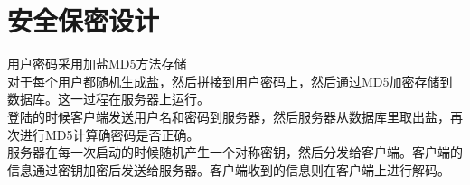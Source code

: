 \chapter{安全保密设计}
用户密码采用加盐MD5方法存储\\
对于每个用户都随机生成盐，然后拼接到用户密码上，然后通过MD5加密存储到数据库。这一过程在服务器上运行。\\
登陆的时候客户端发送用户名和密码到服务器，然后服务器从数据库里取出盐，再次进行MD5计算确密码是否正确。\\
服务器在每一次启动的时候随机产生一个对称密钥，然后分发给客户端。客户端的信息通过密钥加密后发送给服务器。客户端收到的信息则在客户端上进行解码。\\